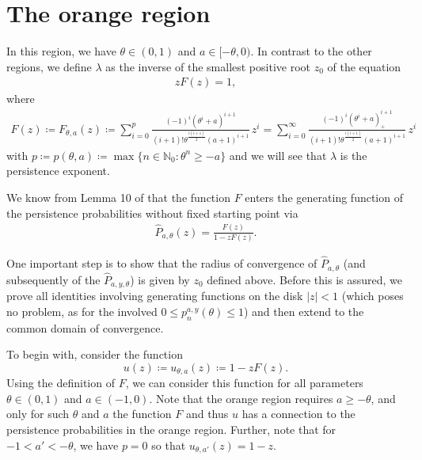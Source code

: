 \documentclass[12pt]{article}
\newcommand{\N}{\mathbb{N}} %
\newcommand{\R}{\mathbb{R}} %
\newcommand{\1}{\mathds{1}}
\theoremstyle{definition}
\theoremstyle{plain}
\theoremstyle{remark}
\newtheorem{Remark}{Remark}
\begin{document}
\section{The orange region}\label{orange_region}
In this region, we have $\theta\in(0,1)$ and $a\in[-\theta,0)$.
In contrast to the other regions, we define $\lambda$ as the inverse of the smallest positive root $z_0$ of the equation
\begin{align}\label{root_orange}
    zF(z)=1,
\end{align}
where
\begin{align*}
    F(z)\coloneqq F_{\theta,a}(z)\coloneqq\sum_{i=0}^p\frac{(-1)^i(\theta^i+a)^{i+1}}{(i+1)!\theta^{\frac{i(i+1)}{2}}(a+1)^{i+1}}\, z^i
    =\sum_{i=0}^{\infty}\frac{(-1)^i(\theta^i+a)_+^{i+1}}{(i+1)!\theta^{\frac{i(i+1)}{2}}(a+1)^{i+1}}\, z^i
\end{align*}
with $p\coloneqq p(\theta,a)\coloneqq\max\{n\in\N_0:\theta^n\geq-a\}$ and we will see that $\lambda$ is the persistence exponent. 

We know from Lemma 10 of \cite{AurzadaRaschel} that the function $F$ enters the generating function of the persistence probabilities without fixed starting point via
\begin{align} \label{eqn:orange:gfintegrated}
    \hat{P}_{a,\theta}(z)=\frac{F(z)}{1-zF(z)}.
\end{align}

One important step is to show that the radius of convergence of $\hat P_{a,\theta}$ (and subsequently of the $\hat P_{a,y,\theta}$) is given by $z_0$ defined above. Before this is assured, we prove all identities involving generating functions on the disk $|z|<1$ (which poses no problem, as for the involved $0\leq p_n^{a,y}(\theta)\leq 1$) and then extend to the common domain of convergence.

To begin with, consider the function
\begin{equation} \label{eqn:orange:defn.u}
u(z)\coloneqq u_{\theta,a}(z)\coloneqq 1-zF(z).
\end{equation}
Using the definition of $F$, we can consider this function for all parameters $\theta\in(0,1)$ and $a\in(-1,0)$. Note that the orange region requires $a\geq -\theta$, and only for such $\theta$ and $a$ the function $F$ and thus $u$ has a connection to the persistence probabilities in the orange region. Further, note that for $-1<a'<-\theta$, we have $p=0$ so that $u_{\theta,a'}(z)=1-z$.
\end{document}
